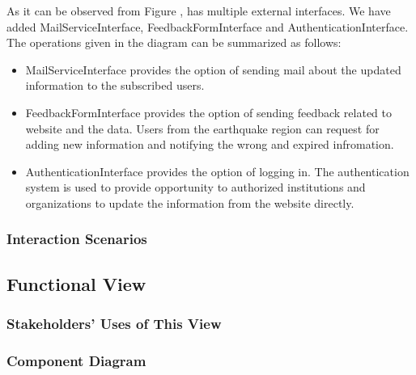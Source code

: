 As it can be observed from Figure , \afetbilgi has multiple external interfaces. We have added MailServiceInterface, FeedbackFormInterface and AuthenticationInterface. The operations given in the diagram can be summarized as follows:
\begin{itemize}
  \item MailServiceInterface provides the option of sending mail about the updated information to the subscribed users.
  \item FeedbackFormInterface provides the option of sending feedback related to website and the data. Users from the earthquake region can request for adding new information and notifying the wrong and expired infromation.
  \item AuthenticationInterface provides the option of logging in. The authentication system is used to provide opportunity to authorized institutions and organizations to update the information from the website directly.
\end{itemize}

\subsubsection{Interaction Scenarios}

\subsection{Functional View}

\subsubsection{Stakeholders' Uses of This View}

\subsubsection{Component Diagram}

